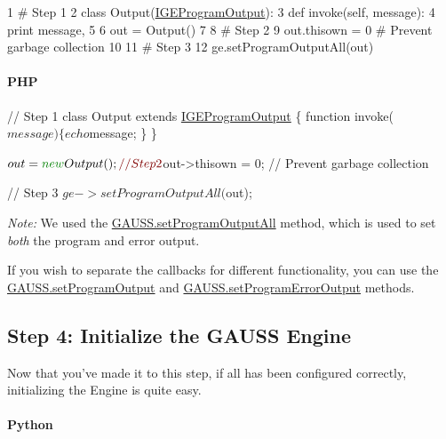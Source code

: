 \begin{DoxyCode}
1 \textcolor{comment}{# Step 1}
2 \textcolor{keyword}{class }Output(\hyperlink{class_i_g_e_program_output}{IGEProgramOutput}):
3     \textcolor{keyword}{def }invoke(self, message):
4         \textcolor{keywordflow}{print} message,
5 
6 out = Output()
7 
8 \textcolor{comment}{# Step 2}
9 out.thisown = 0 \textcolor{comment}{# Prevent garbage collection}
10 
11 \textcolor{comment}{# Step 3}
12 ge.setProgramOutputAll(out)
\end{DoxyCode}
 \paragraph*{P\-H\-P}


\begin{DoxyCode}
\textcolor{comment}{// Step 1}
\textcolor{keyword}{class }Output \textcolor{keyword}{extends} \hyperlink{class_i_g_e_program_output}{IGEProgramOutput} \{
    \textcolor{keyword}{function} invoke($message) \{
        echo $message;
    \}
\}

$out = \textcolor{keyword}{new} Output();

\textcolor{comment}{// Step 2}
$out->thisown = 0; \textcolor{comment}{// Prevent garbage collection}

\textcolor{comment}{// Step 3}
$ge->setProgramOutputAll($out);
\end{DoxyCode}


{\itshape Note\-:} We used the \hyperlink{class_g_a_u_s_s_a0b8379c48d677e05aeab433dba66fbb6}{G\-A\-U\-S\-S.\-set\-Program\-Output\-All} method, which is used to set {\itshape both} the program and error output.

If you wish to separate the callbacks for different functionality, you can use the \hyperlink{class_g_a_u_s_s_a7f0dc6b5b307aa06c347f9c6a9fdacab}{G\-A\-U\-S\-S.\-set\-Program\-Output} and \hyperlink{class_g_a_u_s_s_abd75266b2c4075da75163fe95b013ef3}{G\-A\-U\-S\-S.\-set\-Program\-Error\-Output} methods.\hypertarget{index_hw_step4}{}\subsection{Step 4\-: Initialize the G\-A\-U\-S\-S Engine}\label{index_hw_step4}
Now that you've made it to this step, if all has been configured correctly, initializing the Engine is quite easy.

\paragraph*{Python}



